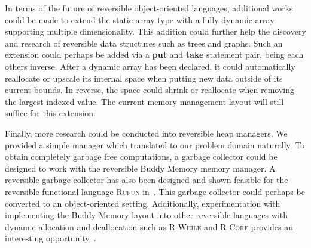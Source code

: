 In terms of the future of reversible object-oriented languages, additional works could be made to extend the static array type with a fully dynamic array supporting multiple dimensionality. This addition could further help the discovery and research of reversible data structures such as trees and graphs. Such an extension could perhaps be added via a \textbf{put} and \textbf{take} statement pair, being each others inverse. After a dynamic array has been declared, it could automatically reallocate or upscale its internal space when putting new data outside of its current bounds. In reverse, the space could shrink or reallocate when removing the largest indexed value. The current memory management layout will still suffice for this extension.

Finally, more research could be conducted into reversible heap managers. We provided a simple manager which translated to our problem domain naturally. To obtain completely garbage free computations, a garbage collector could be designed to work with the reversible Buddy Memory memory manager. A reversible garbage collector has also been designed and shown feasible for the reversible functional language \textsc{Rcfun} in~\cite{tm:garbage}. This garbage collector could perhaps be converted to an object-oriented setting. Additionally, experimentation with implementing the Buddy Memory layout into other reversible languages with dynamic allocation and deallocation such as \textsc{R-While} and \textsc{R-Core} provides an interesting opportunity~\cite{rg:rwhile, rg:rcore}.
